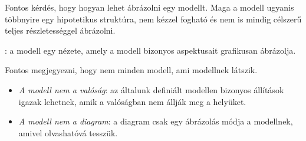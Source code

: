Fontos kérdés, hogy hogyan lehet ábrázolni egy modellt. Maga a modell ugyanis többnyire egy hipotetikus struktúra, nem kézzel fogható és nem is mindig célszerű teljes részletességgel ábrázolni.

\begin{definicio}
	: a modell egy nézete, amely a modell bizonyos aspektusait grafikusan ábrázolja.
\end{definicio}

\begin{megjegyzes}
Fontos megjegyezni, hogy nem minden modell, ami modellnek látszik.

\begin{itemize}
	\item \emph{A modell nem a valóság}: az általunk definiált modellen bizonyos állítások igazak lehetnek, amik a valóságban nem állják meg a helyüket.
	\item \emph{A modell nem a diagram}: a diagram csak egy ábrázolás módja a modellnek, amivel olvashatóvá tesszük.
\end{itemize}
\end{megjegyzes}

